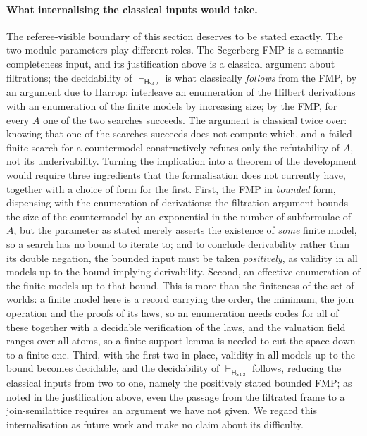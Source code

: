 \documentclass{article}
\newcommand{\logic}{\mathsf{S4.2}}
\newcommand{\hilbertlogic}[1]{\mathsf{H}_{#1}}
\theoremstyle{definition}
\begin{document}
\paragraph{What internalising the classical inputs would take.}
The referee-visible boundary of this section deserves to be stated exactly. The two module parameters play different roles. The Segerberg FMP is a semantic completeness input, and its justification above is a classical argument about filtrations; the decidability of $\vdash_{\hilbertlogic{\logic}}$ is what classically \emph{follows} from the FMP, by an argument due to Harrop: interleave an enumeration of the Hilbert derivations with an enumeration of the finite models by increasing size; by the FMP, for every $A$ one of the two searches succeeds. The argument is classical twice over: knowing that one of the searches succeeds does not compute which, and a failed finite search for a countermodel constructively refutes only the refutability of $A$, not its underivability. Turning the implication into a theorem of the development would require three ingredients that the formalisation does not currently have, together with a choice of form for the first. First, the FMP in \emph{bounded} form, dispensing with the enumeration of derivations: the filtration argument bounds the size of the countermodel by an exponential in the number of subformulae of $A$, but the parameter as stated merely asserts the existence of \emph{some} finite model, so a search has no bound to iterate to; and to conclude derivability rather than its double negation, the bounded input must be taken \emph{positively}, as validity in all models up to the bound implying derivability. Second, an effective enumeration of the finite models up to that bound. This is more than the finiteness of the set of worlds: a finite model here is a record carrying the order, the minimum, the join operation and the proofs of its laws, so an enumeration needs codes for all of these together with a decidable verification of the laws, and the valuation field ranges over all atoms, so a finite-support lemma is needed to cut the space down to a finite one. Third, with the first two in place, validity in all models up to the bound becomes decidable, and the decidability of $\vdash_{\hilbertlogic{\logic}}$ follows, reducing the classical inputs from two to one, namely the positively stated bounded FMP; as noted in the justification above, even the passage from the filtrated frame to a join-semilattice requires an argument we have not given. We regard this internalisation as future work and make no claim about its difficulty.
\end{document}

